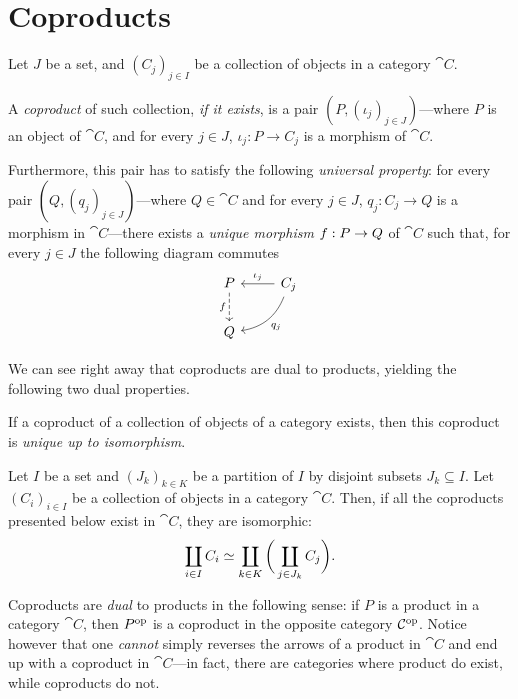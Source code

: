 \section{Coproducts}

\begin{definition}[Coproduct]
\label{def:coproduct}
Let \(J\) be a set, and \((C_j)_{j \in I}\) be a
collection of objects in a category \(\cat C\).

A \emph{coproduct} of such collection, \emph{if it exists}, is a pair
\((P, (\iota_j)_{j \in J})\)---where \(P\) is an object of \(\cat C\), and for
every \(j \in J\), \(\iota_j: P \to C_j\) is a morphism of \(\cat C\).

Furthermore, this pair has to satisfy the following \emph{universal property}:
for every pair \((Q, (q_j)_{j \in J})\)---where \(Q \in \cat C\) and for every
\(j \in J\), \(q_j: C_j \to Q\) is a morphism in \(\cat C\)---there exists a
\emph{unique morphism} \(f: P \to Q\) of \(\cat C\) such that, for every
\(j \in J\) the following diagram commutes
\[
\begin{tikzcd}
P \ar[d, dashed, "f"']
&C_j \ar[l, "\iota_j"'] \ar[ld, bend left, "q_j"] \\
Q &
\end{tikzcd}
\]
\end{definition}

We can see right away that coproducts are dual to products, yielding the
following two dual properties.

\begin{proposition}[Uniqueness]
\label{prop:coproduct-unique-up-to-iso}
If a coproduct of a collection of objects of a category exists, then this
coproduct is \emph{unique up to isomorphism}.
\end{proposition}

\begin{proposition}
\label{prop:coproduct-ordering-independent}
Let \(I\) be a set and \((J_k)_{k \in K}\) be a partition of \(I\) by disjoint
subsets \(J_k \subseteq I\). Let \((C_i)_{i \in I}\) be a collection of objects
in a category \(\cat C\). Then, if all the coproducts presented below exist in
\(\cat C\), they are isomorphic:
\[
\coprod_{i \in I} C_i \simeq \coprod_{k \in K} \bigg(\coprod_{j \in J_k} C_j \bigg).
\]
\end{proposition}

\begin{remark}[Duality]
\label{rem:coproducts-dual-product}
Coproducts are \emph{dual} to products in the following sense: if \(P\) is a
product in a category \(\cat C\), then \(P^{\mathrm{op}}\) is a coproduct in the
opposite category \(\mathcal C^{\mathrm{op}}\). Notice however that one \emph{cannot} simply
reverses the arrows of a product in \(\cat C\) and end up with a coproduct in
\(\cat C\)---in fact, there are categories where product do exist, while
coproducts do not.
\end{remark}

